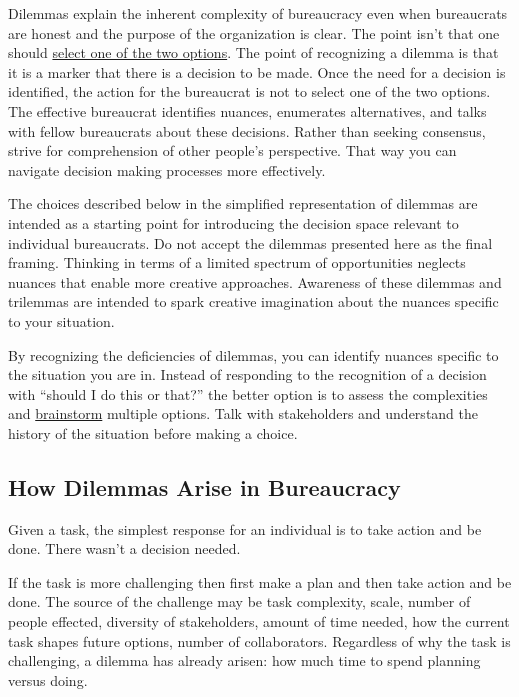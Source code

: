 Dilemmas explain the inherent complexity of bureaucracy even when bureaucrats are honest and the purpose of the organization is clear.
The point isn't that one should \href{https://en.wikipedia.org/wiki/False_dilemma}{select one of the two options}. The point of recognizing a dilemma is that it is a marker that there is a decision to be made.
Once the need for a decision is identified, the action for the bureaucrat is not to select one of the two options. The effective bureaucrat identifies nuances, enumerates alternatives, and talks with fellow bureaucrats about these decisions. Rather than seeking consensus, strive for comprehension of other people's perspective. That way you can navigate decision making processes more effectively.

The choices described below in the simplified representation of dilemmas are intended as a starting point for introducing the decision space relevant to individual bureaucrats. Do not accept the dilemmas presented here as the final framing. Thinking in terms of a limited spectrum of opportunities neglects nuances that enable more creative approaches. 
Awareness of these dilemmas and trilemmas are intended to spark creative imagination about the nuances specific to your situation.

By recognizing the deficiencies of dilemmas, you can identify nuances specific to the situation you are in. Instead of responding to the recognition of a decision with ``should I do this or that?'' the better option is to assess the complexities and \href{https://en.wikipedia.org/wiki/Brainstorming}{brainstorm} multiple options. Talk with stakeholders and understand the history of the situation before making a choice.



\subsection*{How Dilemmas Arise in Bureaucracy}

Given a task, the simplest response for an individual is to take action and be done. There wasn't a decision needed.

If the task is more challenging then first make a plan and then take action and be done. The source of the challenge may be task complexity, scale, number of people effected, diversity of stakeholders, amount of time needed, how the current task shapes future options, number of collaborators. Regardless of why the task is challenging, a dilemma has already arisen: how much time to spend planning versus doing. 

